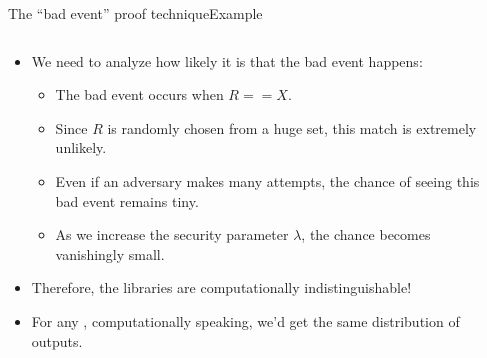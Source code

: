 \documentclass[aspectratio=169, lualatex, handout]{beamer}
\begin{document}
\begin{frame}{The ``bad event'' proof technique}{Example}
	\begin{columns}[c]
		\begin{column}{0.8\textwidth}
			\begin{itemize}
				\item We need to analyze how likely it is that the bad event happens:
				      \begin{itemize}
					      \item The bad event occurs when $R == X$.
					      \item Since $R$ is randomly chosen from a huge set, this match is extremely unlikely.
					      \item Even if an adversary makes many attempts, the chance of seeing this bad event remains tiny.
					      \item As we increase the security parameter $\lambda$, the chance becomes vanishingly small.
				      \end{itemize}
				\item Therefore, the libraries are computationally indistinguishable!
				\item For any \prog{}, computationally speaking, we'd get the same distribution of outputs.
			\end{itemize}
		\end{column}
		\begin{column}{0.2\textwidth}
		\end{column}
	\end{columns}
\end{frame}
\end{document}
